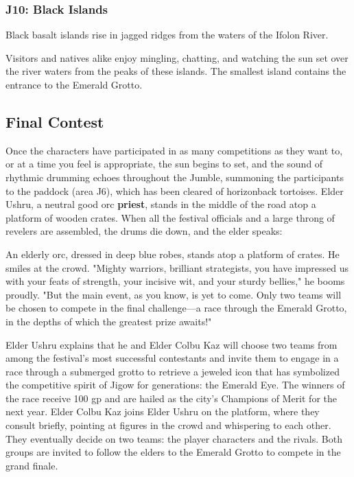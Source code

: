 \documentclass[10pt,a4,twoside,twocolumn,openany,nodeprecatedcode]{dndbook}
\begin{document}
\subsubsection{J10: Black Islands}
\begin{DndReadAloud}{}
Black basalt islands rise in jagged ridges from the waters of the Ifolon River.
\end{DndReadAloud}

Visitors and natives alike enjoy mingling, chatting, and watching the sun set over the river waters from the peaks of these islands. The smallest island contains the entrance to the Emerald Grotto.
\subsection{Final Contest}
Once the characters have participated in as many competitions as they want to, or at a time you feel is appropriate, the sun begins to set, and the sound of rhythmic drumming echoes throughout the Jumble, summoning the participants to the paddock (area J6), which has been cleared of horizonback tortoises. Elder Ushru, a neutral good orc \textbf{priest}, stands in the middle of the road atop a platform of wooden crates. When all the festival officials and a large throng of revelers are assembled, the drums die down, and the elder speaks:
\begin{DndReadAloud}{}
An elderly orc, dressed in deep blue robes, stands atop a platform of crates. He smiles at the crowd. "Mighty warriors, brilliant strategists, you have impressed us with your feats of strength, your incisive wit, and your sturdy bellies," he booms proudly. "But the main event, as you know, is yet to come. Only two teams will be chosen to compete in the final challenge—a race through the Emerald Grotto, in the depths of which the greatest prize awaits!"
\end{DndReadAloud}

Elder Ushru explains that he and Elder Colbu Kaz will choose two teams from among the festival's most successful contestants and invite them to engage in a race through a submerged grotto to retrieve a jeweled icon that has symbolized the competitive spirit of Jigow for generations: the Emerald Eye. The winners of the race receive 100 gp and are hailed as the city's Champions of Merit for the next year.
Elder Colbu Kaz joins Elder Ushru on the platform, where they consult briefly, pointing at figures in the crowd and whispering to each other. They eventually decide on two teams: the player characters and the rivals. Both groups are invited to follow the elders to the Emerald Grotto to compete in the grand finale.
\end{document}
